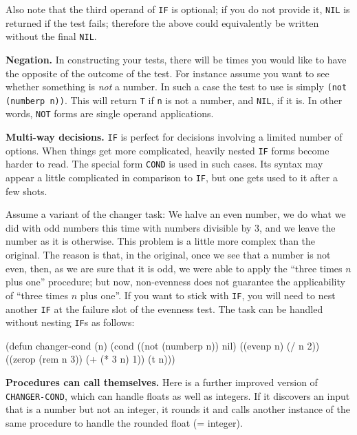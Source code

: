 \documentclass[a4paper,11pt]{article}
\begin{document}
\begin{uenum}
\begin{uenumi}
\item Also note that the third operand of \Verb+IF+ is optional; if you do not provide it, \Verb+NIL+ is returned if the test fails; therefore the above could equivalently be written without the final \Verb+NIL+.
\end{uenumi}

\item {\bf Negation.} In constructing your tests, there will be times you would like to have the opposite of the outcome of the test. For instance assume you want to see whether something is \emph{not} a number. In such a case the test to use is simply \Verb+(not (numberp n))+. This will return \Verb+T+ if \Verb+n+ is not a number, and \Verb+NIL+, if it is. In other words, \Verb+NOT+ forms are single operand applications.

\item {\bf Multi-way decisions.} \Verb+IF+ is perfect for decisions involving a limited number of options. When things get more complicated, heavily nested \Verb+IF+ forms become harder to read. The special form \Verb+COND+ is used in such cases. Its syntax may appear a little complicated in comparison to \Verb+IF+, but one gets used to it after a few shots.

Assume a variant of the changer task: We halve an even number, we do what we did with odd numbers this time with numbers divisible by 3, and we leave the number as it is otherwise. This problem is a little more complex than the original. The reason is that, in the original, once we see that a number is not even, then, as we are sure that it is odd, we were able to apply the ``three times $n$ plus one'' procedure; but now, non-evenness does not guarantee the applicability of ``three times $n$ plus one''. If you want to stick with \Verb+IF+, you will need to nest another \Verb+IF+ at the failure slot of the evenness test. The task can be handled without nesting \Verb+IF+s as follows:

\begin{lispcode}
(defun changer-cond (n)
  (cond ((not (numberp n)) nil)
        ((evenp n) (/ n 2))
        ((zerop (rem n 3)) (+ (* 3 n) 1))
        (t n)))
\end{lispcode}

\item {\bf Procedures can call themselves.} Here is a further improved version of \Verb+CHANGER-COND+, which can handle floats as well as integers. If it discovers an input that is a number but not an integer, it rounds it and calls another instance of the same procedure to handle the rounded float (= integer).  


\end{uenum}
\end{document}
